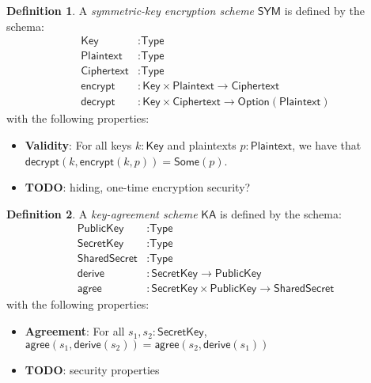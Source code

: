 \documentclass[a4paper]{article}
\newcommand{\TODO}[1]{{\color{red}\textbf{TODO}}: #1}
\theoremstyle{definition}
\newtheorem{definition}{Definition}[subsection]
\newcommand{\Ciphertext}{{\textsf{Ciphertext}}}
\newcommand{\KA}{{\textsf{KA}}}
\newcommand{\Key}{{\textsf{Key}}}
\newcommand{\Option}{{\textsf{Option}}}
\newcommand{\Plaintext}{{\textsf{Plaintext}}}
\newcommand{\PublicKey}{{\textsf{PublicKey}}}
\newcommand{\SYM}{{\textsf{SYM}}}
\newcommand{\SecretKey}{{\textsf{SecretKey}}}
\newcommand{\SharedSecret}{{\textsf{SharedSecret}}}
\newcommand{\Some}{{\textsf{Some}}}
\newcommand{\Type}{{\textsf{Type}}}
\newcommand{\agree}{{\textsf{agree}}}
\newcommand{\decrypt}{{\textsf{decrypt}}}
\newcommand{\derive}{{\textsf{derive}}}
\newcommand{\encrypt}{{\textsf{encrypt}}}
\begin{document}
\begin{definition}
A \emph{symmetric-key encryption scheme} $\SYM$ is defined by the schema:
\begin{align*}
    \Key &: \Type \\
    \Plaintext &: \Type \\
    \Ciphertext &: \Type \\
    \encrypt &: \Key \times \Plaintext \to \Ciphertext \\
    \decrypt &: \Key \times \Ciphertext \to \Option(\Plaintext)
\end{align*}
with the following properties:

\begin{itemize}
    \item \textbf{Validity}: For all keys $k : \Key$ and plaintexts $p : \Plaintext$, we have that $\decrypt(k, \encrypt(k, p)) = \Some(p)$.
    \item \TODO{hiding, one-time encryption security?}
\end{itemize}
\end{definition}

\begin{definition}
    A \emph{key-agreement scheme} $\KA$ is defined by the schema:
    \begin{align*}
        \PublicKey    &: \Type \\
        \SecretKey    &: \Type \\
        \SharedSecret &: \Type \\
        \derive       &: \SecretKey \to \PublicKey \\
        \agree        &: \SecretKey \times \PublicKey \to \SharedSecret
    \end{align*}
    with the following properties:

    \begin{itemize}
        \item \textbf{Agreement}: For all $s_1, s_2 : \SecretKey$, $\agree(s_1, \derive(s_2)) = \agree(s_2, \derive(s_1))$
        \item \TODO{security properties}
    \end{itemize}
\end{definition}
\end{document}
